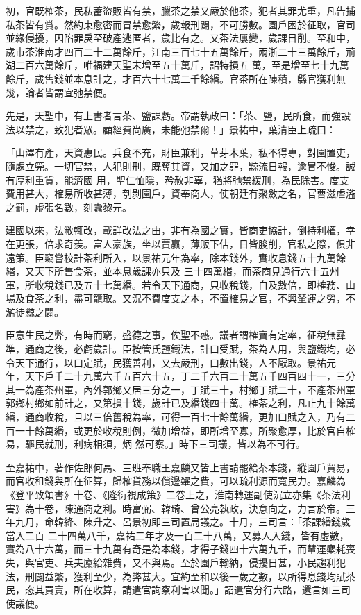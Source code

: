 \begin{pinyinscope}
 初，官既榷茶，民私蓄盜販皆有禁，臘茶之禁又嚴於他茶，犯者其罪尤重，凡告捕私茶皆有賞。然約束愈密而冒禁愈繁，歲報刑闢，不可勝數。園戶困於征取，官司並緣侵擾，因陷罪戾至破產逃匿者，歲比有之。又茶法屢變，歲課日削。至和中，歲市茶淮南才四百二十二萬餘斤，江南三百七十五萬餘斤，兩浙二十三萬餘斤，荊湖二百六萬餘斤，唯福建天聖末增至五十萬斤，詔特損五
 萬，至是增至七十九萬餘斤，歲售錢並本息計之，才百六十七萬二千餘緡。官茶所在陳積，縣官獲利無幾，論者皆謂宜弛禁便。



 先是，天聖中，有上書者言茶、鹽課虧。帝謂執政曰：「茶、鹽，民所食，而強設法以禁之，致犯者眾。顧經費尚廣，未能弛禁爾！」景祐中，葉清臣上疏曰：



 「山澤有產，天資惠民。兵食不充，財臣兼利，草芽木葉，私不得專，對園置吏，隨處立筦。一切官禁，人犯則刑，既奪其資，又加之罪，黥流日報，逾冒不悛。誠有厚利重貨，能濟國
 用，聖仁恤隱，矜赦非辜，猶將弛禁緩刑，為民除害。度支費用甚大，榷易所收甚薄，刳剝園戶，資奉商人，使朝廷有聚斂之名，官曹滋虐濫之罰，虛張名數，刻蠹黎元。



 建國以來，法敝輒改，載詳改法之由，非有為國之實，皆商吏協計，倒持利權，幸在更張，倍求奇羨。富人豪族，坐以賈贏，薄販下估，日皆朘削，官私之際，俱非遠策。臣竊嘗校計茶利所入，以景祐元年為率，除本錢外，實收息錢五十九萬餘緡，又天下所售食茶，並本息歲課亦只及
 三十四萬緡，而茶商見通行六十五州軍，所收稅錢已及五十七萬緡。若令天下通商，只收稅錢，自及數倍，即榷務、山場及食茶之利，盡可籠取。又況不費度支之本，不置榷易之官，不興輦運之勞，不濫徒黥之闢。



 臣意生民之弊，有時而窮，盛德之事，俟聖不惑。議者謂榷賣有定率，征稅無彞準，通商之後，必虧歲計。臣按管氏鹽鐵法，計口受賦，茶為人用，與鹽鐵均，必令天下通行，以口定賦，民獲善利，又去嚴刑，口數出錢，人不厭取。景祐元
 年，天下戶千二十九萬六千五百六十五，丁二千六百二十萬五千四百四十一，三分其一為產茶州軍，內外郭鄉又居三分之一，丁賦三十，村鄉丁賦二十，不產茶州軍郭鄉村鄉如前計之，又第損十錢，歲計已及緡錢四十萬。榷茶之利，凡止九十餘萬緡，通商收稅，且以三倍舊稅為率，可得一百七十餘萬緡，更加口賦之入，乃有二百一十餘萬緡，或更於收稅則例，微加增益，即所增至寡，所聚愈厚，比於官自榷易，驅民就刑，利病相須，炳
 然可察。」時下三司議，皆以為不可行。



 至嘉祐中，著作佐郎何鬲、三班奉職王嘉麟又皆上書請罷給茶本錢，縱園戶貿易，而官收租錢與所在征算，歸榷貨務以償邊糴之費，可以疏利源而寬民力。嘉麟為《登平致頌書》十卷、《隆衍視成策》二卷上之，淮南轉運副使沉立亦集《茶法利害》為十卷，陳通商之利。時富弼、韓琦、曾公亮執政，決意向之，力言於帝。三年九月，命韓絳、陳升之、呂景初即三司置局議之。十月，三司言：「茶課緡錢歲當入二百
 二十四萬八千，嘉祐二年才及一百二十八萬，又募人入錢，皆有虛數，實為八十六萬，而三十九萬有奇是為本錢，才得子錢四十六萬九千，而輦運麋耗喪失，與官吏、兵夫廩給雜費，又不與焉。至於園戶輸納，侵擾日甚，小民趨利犯法，刑闢益繁，獲利至少，為弊甚大。宜約至和以後一歲之數，以所得息錢均賦茶民，恣其買賣，所在收算，請遣官詢察利害以聞。」詔遣官分行六路，還言如三司使議便。




\end{pinyinscope}
